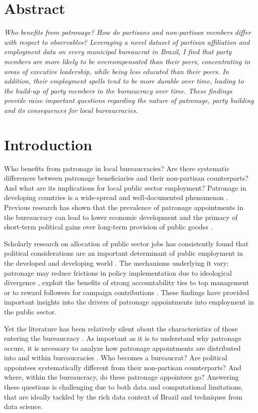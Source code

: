 \section*{Abstract}
\emph{Who benefits from patronage? How do partisans and non-partisan members differ with respect to observables? Leveraging a novel dataset of partisan affiliation and employment data on every municipal bureaucrat in Brazil, I find that party members are more likely to be overcompensated than their peers, concentrating in areas of executive leadership, while being less educated than their peers. In addition, their employment spells tend to be more durable over time, leading to the build-up of party members in the bureaucracy over time. These findings provide raise important questions regarding the nature of patronage, party building and its consequences for local bureaucracies.}

\section{Introduction}
\label{sec:intro}

Who benefits from patronage in local bureaucracies? Are there systematic differences between patronage beneficiaries and their non-partisan counterparts? And what are its implications for local public sector employment? Patronage in developing countries is a wide-spread and well-documented phenomenon \citep{robinson2013political, grindle2012jobs}. Previous research has shown that the prevalence of patronage appointments in the bureaucracy can lead to lower economic development \citep{evans_bureaucracy_1999,kohli2004state} and the primacy of short-term political gains over long-term provision of public goodss \citep{remmer2007political}.

Scholarly research on allocation of public sector jobs has consistently found that political considerations are an important determinant of public employment in the developed and developing world \citep{finan2017personnel, grindle2012jobs}. The mechanisms underlying it vary: patronage may reduce frictions in policy implementation due to ideological divergence \citep{krause2016experiential}, exploit the benefits of strong accountability ties to top management \citep{toral2019benefits} or to reward followers for campaign contributions \citep{colonnelli2018patronage}. These findings have provided important insights into the drivers of patronage appointments into employment in the public sector. 

Yet the literature has been relatively silent about the characteristics of those entering the bureaucracy \citep{finan2015personnel}. As important as it is to understand why patronage occurs, it is necessary to analyze how patronage appointments are distributed into and within bureaucracies \citep{bersch_state_2017}. Who becomes a bureaucrat? Are political appointees systematically different from their non-partisan counterparts? And where, within the bureaucracy, do these patronage appointees go? Answering these questions is challenging due to both data and computational limitations, that are ideally tackled by the rich data context of Brazil and techniques from data science.


